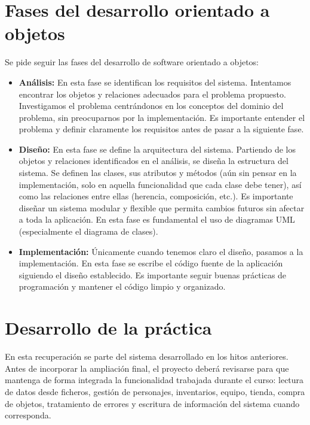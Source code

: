 \documentclass[11pt,a4paper]{article}
\begin{document}
\clearpage
\section{Fases del desarrollo orientado a objetos}

Se pide seguir las fases del desarrollo de software orientado a objetos:

\begin{itemize}
    \item \textbf{Análisis:} En esta fase se identifican los requisitos del sistema. Intentamos encontrar los objetos y relaciones adecuados para el problema propuesto. Investigamos el problema centrándonos en los conceptos del dominio del problema, sin preocuparnos por la implementación. Es importante entender el problema y definir claramente los requisitos antes de pasar a la siguiente fase.
    \item \textbf{Diseño:} En esta fase se define la arquitectura del sistema. Partiendo de los objetos y relaciones identificados en el análisis, se diseña la estructura del sistema. Se definen las clases, sus atributos y métodos (aún sin pensar en la implementación, solo en aquella funcionalidad que cada clase debe tener), así como las relaciones entre ellas (herencia, composición, etc.). Es importante diseñar un sistema modular y flexible que permita cambios futuros sin afectar a toda la aplicación. En esta fase es fundamental el uso de diagramas UML (especialmente el diagrama de clases).
    \item \textbf{Implementación:} Únicamente cuando tenemos claro el diseño, pasamos a la implementación. En esta fase se escribe el código fuente de la aplicación siguiendo el diseño establecido. Es importante seguir buenas prácticas de programación y mantener el código limpio y organizado.
\end{itemize}

\section{Desarrollo de la práctica}

En esta recuperación se parte del sistema desarrollado en los hitos anteriores. Antes de incorporar la ampliación final, el proyecto deberá revisarse para que mantenga de forma integrada la funcionalidad trabajada durante el curso: lectura de datos desde ficheros, gestión de personajes, inventarios, equipo, tienda, compra de objetos, tratamiento de errores y escritura de información del sistema cuando corresponda.
\end{document}
